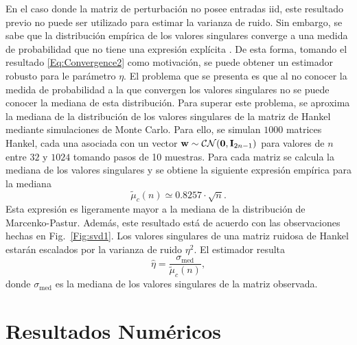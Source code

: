 
En el caso donde la matriz de perturbación no posee entradas iid, este resultado previo no puede ser utilizado para estimar la varianza de ruido. Sin embargo, se sabe que la distribución empírica de los valores singulares converge a una medida de probabilidad que no tiene una expresión explícita \cite{Bryc2006}. De esta forma, tomando el resultado \eqref{Eq:Convergence2} como motivación, se puede obtener un estimador robusto para le parámetro $\eta$. %
El problema que se presenta es que al no conocer la medida de probabilidad a la que convergen los valores singulares no se puede conocer la mediana de esta distribución.  Para superar este problema, se aproxima la mediana de la distribución de los valores singulares de la matriz de Hankel mediante simulaciones de Monte Carlo. Para ello, se simulan $1000$ matrices Hankel, cada una asociada con un vector $\mathbf{w}\sim\mathcal{CN}(\mathbf{0},\mathbf{I}_{2n-1})$ para valores de $n$ entre $32$ y $1024$ tomando pasos de 10 muestras. Para cada matriz se calcula la mediana de los valores singulares y se obtiene la siguiente expresión empírica para la mediana
\begin{equation}
	\tilde{\mu}_c(n) \simeq 0.8257\cdot\sqrt{n}.
	\label{Eq:MedianHankel}
\end{equation}
Esta expresión es ligeramente mayor a la mediana de la distribución de Marcenko-Pastur. Además, este resultado está de acuerdo con las observaciones hechas en Fig.~\ref{Fig:svd1}. Los valores singulares de una matriz ruidosa de Hankel estarán escalados por la varianza de ruido $\eta^2$. El estimador resulta
\begin{equation}
	\hat{\eta} = \frac{\sigma_{\mathrm{med}}}{\tilde{\mu}_c(n)},
\end{equation}
donde $\sigma_{\mathrm{med}}$ es la mediana de los valores singulares de la matriz observada.

\section{Resultados Numéricos}\label{sec:results}

